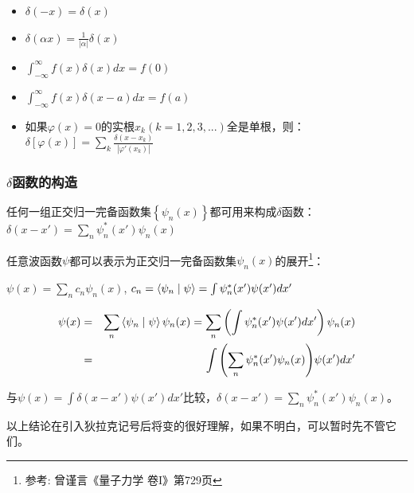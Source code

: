 \begin{itemize}
    \item $\delta ( - x) = \delta (x)$

    \item $\delta (\alpha x) = \frac{1}{{\left| \alpha  \right|}}\delta (x)$

    \item $\int_{ - \infty }^\infty  {f(x)\delta (x)dx}  = f(0)$

    \item $\int_{ - \infty }^\infty  {f(x)\delta (x - a)dx}  = f(a)$

    \item 如果$\varphi (x) = 0$的实根$x_k (k = 1,2,3,...)$全是单根，则：$\delta \left[ {\varphi (x)} \right] = \sum\limits_k {\frac{{\delta (x - x_k )}}{{\left| {\varphi '(x_k )} \right|}}} $

   \end{itemize}

\subsubsection{$\delta$函数的构造}

任何一组正交归一完备函数集$\left\{ {\psi _n (x)} \right\}$都可用来构成$\delta$函数：
$\delta (x - x') = \sum\limits_n {\psi _n ^* (x')\psi _n (x)} $

任意波函数$\psi$都可以表示为正交归一完备函数集$\psi _n (x)$的展开\footnote{参考: 曾谨言《量子力学 卷I》第729页}：

$\psi (x) = \sum\limits_n {c_n \psi _n (x)} $, $c_n  = \left\langle {{\psi _n }}
 \mathrel{\left | {\vphantom {{\psi _n } \psi }}
 \right. \kern-\nulldelimiterspace}
 {\psi } \right\rangle  = \int {\psi _n ^* (x')\psi (x')dx'} $

\begin{eqnarray*}
\psi (x) & = & \sum\limits_n {\left\langle {{\psi _n }}
 \mathrel{\left | {\vphantom {{\psi _n } \psi }}
 \right. \kern-\nulldelimiterspace}
 {\psi } \right\rangle \psi _n (x)}  = \sum\limits_n {\left( {\int {\psi _n ^* (x')\psi (x')dx'} } \right)\psi _n (x)} \\
{} & = & \int {\left( {\sum\limits_n {\psi _n ^* (x')\psi _n (x)} } \right)} \psi (x')dx'
\end{eqnarray*}

与$\psi (x) = \int {\delta (x - x')\psi (x')dx'} $比较，$\delta (x - x') = \sum\limits_n {\psi _n ^* (x')\psi _n (x)} $。

以上结论在引入狄拉克记号后将变的很好理解，如果不明白，可以暂时先不管它们。


